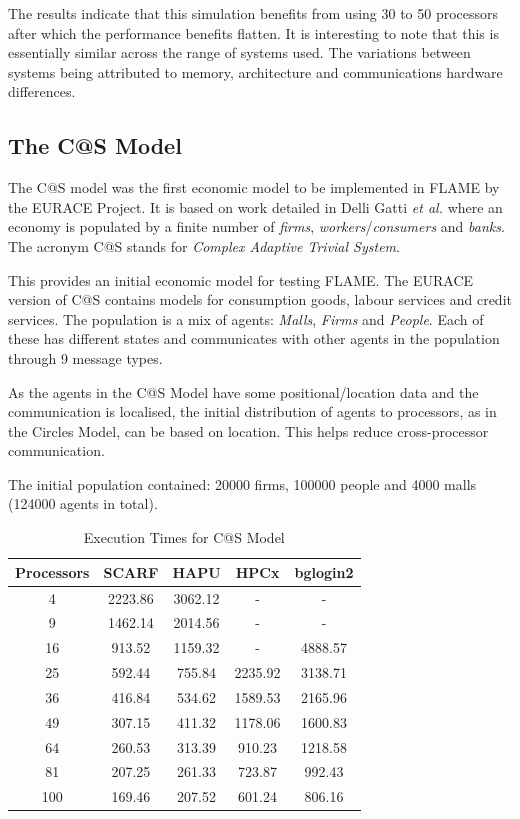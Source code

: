 The results indicate that this simulation benefits from using 30 to 50 processors after which the performance benefits flatten. It is interesting to note that this is essentially similar across the range of systems used. The variations between systems being attributed to memory, architecture and communications hardware differences.

\subsection{The C@S Model}
The C@S model was the first economic model to be implemented in FLAME by the EURACE Project.  It is based on work detailed in Delli Gatti \textsl{et al.} \cite{Delli Gatti} where an economy is populated by a finite number of \textsl{firms}, \textsl{workers}/\textsl{consumers} and \textsl{banks}. The acronym C@S stands for \textsl{Complex Adaptive Trivial System}.

This provides an initial economic model for testing FLAME. The EURACE version of C@S contains models for consumption goods, labour services and credit services. The population is a mix of agents: \textsl{Malls}, \textsl{Firms} and \textsl{People}. Each of these has different states and communicates with other agents in the population through 9 message types.

As the agents in the C@S Model have some positional/location data and the communication is localised, the initial distribution of agents to processors, as in the Circles Model, can be based on location. This helps reduce cross-processor communication.

The initial population contained: 20000 firms, 100000 people and 4000 malls (124000 agents in total).

{
\renewcommand{\arraystretch}{1.25}
\begin{table}[ht]
 \centering
  \begin{tabular}{c|cccc}
 Processors &SCARF &HAPU &HPCx  &bglogin2 \\ \hline
4 &2223.86 &3062.12 &- &-       \\
9 &1462.14 &2014.56 &- &-       \\
16 &913.52 &1159.32 &- &4888.57 \\
25 &592.44 &755.84 &2235.92 &3138.71    \\
36 &416.84 &534.62 &1589.53 &2165.96    \\
49 &307.15 &411.32 &1178.06 &1600.83    \\
64 &260.53 &313.39 &910.23 &1218.58     \\
81 &207.25 &261.33 &723.87 &992.43      \\
100 &169.46 &207.52 &601.24 &806.16     \\
 \end{tabular}
 \caption{Execution Times for C@S Model}
 \label{tab:ExecutionTimesForC@S}
\end{table}
}

